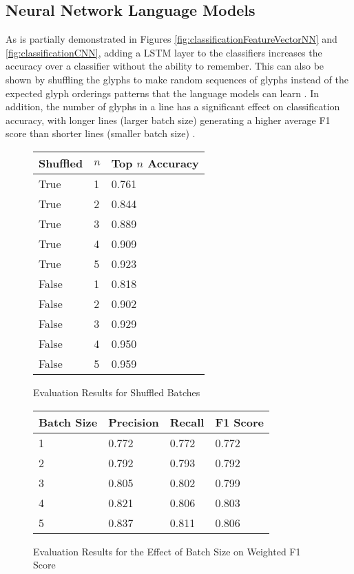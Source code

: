 \subsection{Neural Network Language Models}

As is partially demonstrated in Figures \ref{fig:classificationFeatureVectorNN} and \ref{fig:classificationCNN}, adding a LSTM layer to the classifiers increases the accuracy over a classifier without the ability to remember. This can also be shown by shuffling the glyphs to make random sequences of glyphs instead of the expected glyph orderings patterns that the language models can learn . In addition, the number of glyphs in a line has a significant effect on classification accuracy, with longer lines (larger batch size) generating a higher average F1 score than shorter lines (smaller batch size) .

\begin{figure}[H]
    \caption{Evaluation Results for Shuffled Batches}
    \label{fig:classificationShuffle}
    \centering
    \begin{tabular}{ | l | l | l | }
        \hline
        Shuffled & $n$ & Top $n$ Accuracy \\
        \hline
        True & 1 & 0.761 \\
        True & 2 & 0.844 \\
        True & 3 & 0.889 \\
        True & 4 & 0.909 \\
        True & 5 & 0.923 \\
        False & 1 & 0.818 \\
        False & 2 & 0.902 \\
        False & 3 & 0.929 \\
        False & 4 & 0.950 \\
        False & 5 & 0.959 \\
        \hline
    \end{tabular}
\end{figure}

\begin{figure}[H]
    \caption{Evaluation Results for the Effect of Batch Size on Weighted F1 Score}
    \label{fig:classificationBatchSize}
    \centering
    \begin{tabular}{ | l | l | l | l | }
        \hline
        Batch Size & Precision & Recall & F1 Score \\
        \hline
        1 & 0.772 & 0.772 & 0.772 \\
        2 & 0.792 & 0.793 & 0.792 \\
        3 & 0.805 & 0.802 & 0.799 \\
        4 & 0.821 & 0.806 & 0.803 \\
        5 & 0.837 & 0.811 & 0.806 \\
        \hline
    \end{tabular}
\end{figure}

